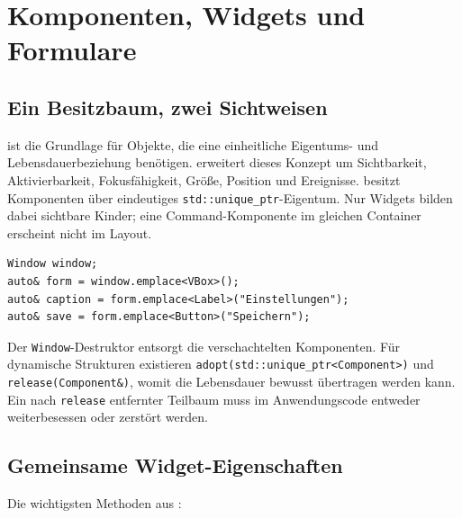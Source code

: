 \chapter{Komponenten, Widgets und Formulare}\label{chap:widgets}

\section{Ein Besitzbaum, zwei Sichtweisen}
 ist die Grundlage für Objekte, die eine
einheitliche Eigentums- und Lebensdauerbeziehung benötigen.
 erweitert dieses Konzept um Sichtbarkeit,
Aktivierbarkeit, Fokusfähigkeit, Größe, Position und Ereignisse.
 besitzt Komponenten über eindeutiges
\texttt{std::unique\_ptr}-Eigentum. Nur Widgets bilden dabei
sichtbare Kinder; eine Command-Komponente im gleichen
Container erscheint nicht im Layout.

\begin{lstlisting}[language=SASDCpp,caption={Eigentum ausdrücklich übergeben}]
Window window;
auto& form = window.emplace<VBox>();
auto& caption = form.emplace<Label>("Einstellungen");
auto& save = form.emplace<Button>("Speichern");
\end{lstlisting}
Der \texttt{Window}-Destruktor entsorgt die verschachtelten
Komponenten. Für dynamische Strukturen existieren
\texttt{adopt(std::unique\_ptr<Component>)} und
\texttt{release(Component\&)}, womit die Lebensdauer bewusst
übertragen werden kann. Ein nach \texttt{release} entfernter
Teilbaum muss im Anwendungscode entweder weiterbesessen oder
zerstört werden.


\section{Gemeinsame Widget-Eigenschaften}
Die wichtigsten Methoden aus :

